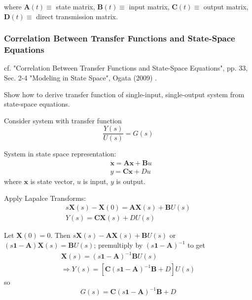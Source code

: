 \documentclass[10pt]{amsart}
\begin{document}
\begin{multicols*}{2}
where $\mathbf{A}(t) \equiv $ state matrix, $\mathbf{B}(t) \equiv $ input matrix, $\mathbf{C}(t) \equiv $ output matrix, $\mathbf{D}(t) \equiv $ direct transmission matrix. 

\subsubsection{Correlation Between Transfer Functions and State-Space Equations}

cf. "Correlation Between Transfer Functions and State-Space Equations", pp. 33, Sec. 2-4 "Modeling in State Space",  Ogata (2009) \cite{Ogat2009}.

Show how to derive transfer function of single-input, single-output system from state-space equations.

Consider system with transfer function 
\[
	\frac{Y(s)}{U(s)} = G(s)
\]

System in state space representation:
\[
\begin{aligned}
& \dot{\mathbf{x}} = \mathbf{A} \mathbf{x} + \mathbf{B} u \\
& y = \mathbf{C} \mathbf{x} + Du 
\end{aligned}
\]
where $\mathbf{x}$ is state vector, $u$ is input, $y$ is output.

Apply Lapalce Transforms:
\begin{equation}
\begin{gathered}
s\mathbf{X}(s) - \mathbf{X}(0) = \mathbf{A} \mathbf{X}(s) + \mathbf{B}U(s) \\
Y(s) = \mathbf{C} \mathbf{X}(s) + DU(s) 
\end{gathered}
\end{equation}

Let $\mathbf{X}(0) = 0$. Then $s\mathbf{X}(s)  - \mathbf{A} \mathbf{X}(s) + \mathbf{B}U(s)$  or $ (s\mathbf{1} - \mathbf{A})\mathbf{X}(s) = \mathbf{B}U(s)$; premultiply by $(s\mathbf{1} - \mathbf{A})^{-1}$ to get 
\[
\begin{gathered}
\mathbf{X}(s) = (s\mathbf{1} - \mathbf{A})^{-1} \mathbf{B} U(s) \\ 
\Longrightarrow Y(s) = [ \mathbf{C}(s\mathbf{1} - \mathbf{A})^{-1} \mathbf{B} + D ] U(s)
\end{gathered}
\]
so
\begin{equation}\label{Eq:TransferFunctionStateSpaceEquationSingleInputSingleOutput}
G(s) = \mathbf{C} ( s\mathbf{1} - \mathbf{A})^{-1} \mathbf{B} + D
\end{equation}


\end{multicols*}
\end{document}
